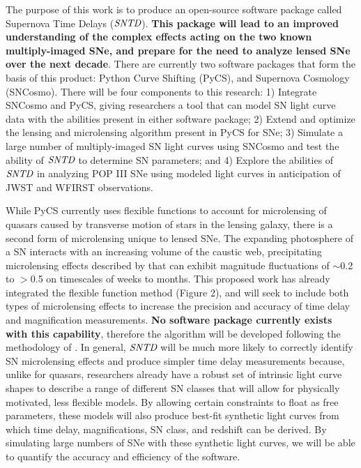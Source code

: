 The purpose of this work is to produce an open-source software
package called Supernova Time Delays ($\textit{SNTD}$). \textbf{This package will
lead to an improved understanding of the complex effects acting on 
the two known multiply-imaged SNe, and prepare for the need to analyze 
lensed SNe over the next decade}.
There are currently two software packages that form the basis 
of this product: Python Curve Shifting (PyCS), and Supernova Cosmology 
(SNCosmo). There will be four components to this research: 1) Integrate 
SNCosmo and PyCS, giving researchers a tool
that can model SN light curve data with the abilities present in either
software package; 2) Extend and optimize the lensing and microlensing
algorithm present in PyCS for SNe; 3) Simulate a large number of multiply-imaged SN
light curves using SNCosmo and test the ability of $\textit{SNTD}$ to
determine SN parameters; and 4) Explore the abilities of
$\textit{SNTD}$ in analyzing POP III SNe using modeled light curves in
anticipation of JWST and WFIRST observations.


While PyCS currently uses flexible functions to account for
microlensing of quasars caused by transverse motion of stars in the
lensing galaxy, there is a second form of microlensing unique to
lensed SNe. The expanding photosphere of a SN interacts with an 
increasing volume of the caustic web, precipitating microlensing effects 
described by \cite{Dobler:2006} that can exhibit magnitude 
fluctuations of $\sim$0.2 to $>$0.5 on timescales of weeks to months. 
This proposed work has already integrated the flexible function method 
(Figure 2), and will seek to include both types of microlensing effects to 
increase the precision and accuracy of time delay and magnification measurements. 
\textbf{No software package currently
exists with this capability}, therefore the algorithm will be developed
following the methodology of \cite{Dobler:2006}. In general,
$\textit{SNTD}$ will be much more likely to correctly identify SN
microlensing effects and produce simpler time delay measurements
because, unlike for quasars, researchers already have a robust set of
intrinsic light curve shapes to describe a range of different SN
classes that will allow for physically motivated, less flexible
models. By allowing certain constraints to float as free parameters,
these models will also produce best-fit synthetic light curves from
which time delay, magnifications, SN class, and redshift can be
derived. By simulating large numbers of SNe with these synthetic light
curves, we will be able to quantify the accuracy and efficiency of the
software.


